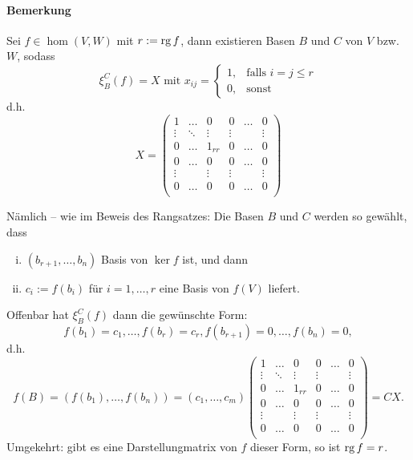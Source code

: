 	\paragraph{Bemerkung}
		Sei $ f\in \hom(V,W) $ mit $ r:= \operatorname{rg} f $, dann existieren Basen $ B $ und $ C $ von $ V $ bzw. $ W $, sodass
		\[
			\xi_B^C(f) = X \text{ mit } x_{ij} =
			\begin{cases}
				1, & \text{falls }i=j\leq r \\
				0, & \text{sonst}
			\end{cases}
		\]
		d.h.
		\[
			X = \left(
			\begin{array}{ccc|ccc}
				1      & \dots  & 0      & 0      & \dots  & 0      \\
				\vdots & \ddots & \vdots & \vdots &        & \vdots \\
				0      & \dots  & 1_{rr} & 0      & \dots  & 0      \\\hline
				0      & \dots  & 0      & 0      & \dots  & 0      \\
				\vdots &        & \vdots & \vdots &        & \vdots \\
				0      & \dots  & 0      & 0      & \dots  & 0      \\
			\end{array}
			\right)
		\]

		Nämlich -- wie im Beweis des Rangsatzes: Die Basen $ B $ und $ C $ werden so gewählt, dass
		\begin{enumerate}[(i)]
			\item $ (b_{r+1},\dots,b_n) $ Basis von $ \ker f $ ist, und dann
			\item $ c_i := f(b_i) $ für $ i= 1,\dots,r $ eine Basis von $ f(V) $ liefert.
		\end{enumerate}
		Offenbar hat $ \xi_B^C(f)$ dann die gewünschte Form:
		\[
			f(b_1)=c_1,\dots,f(b_r)=c_r,f(b_{r+1})=0,\dots,f(b_n)=0,
		\]
		d.h.
		\[
			f(B) = (f(b_1),\dots,f(b_n))=(c_1,\dots,c_m)\left(
			\begin{array}{ccc|ccc}
				1      & \dots  & 0      & 0      & \dots  & 0      \\
				\vdots & \ddots & \vdots & \vdots &        & \vdots \\
				0      & \dots  & 1_{rr} & 0      & \dots  & 0      \\\hline
				0      & \dots  & 0      & 0      & \dots  & 0      \\
				\vdots &        & \vdots & \vdots &        & \vdots \\
				0      & \dots  & 0      & 0      & \dots  & 0      \\
			\end{array}
			\right) = CX.
		\]
		Umgekehrt: gibt es eine Darstellungmatrix von $ f $ dieser Form, so ist $ \operatorname{rg} f = r $.
